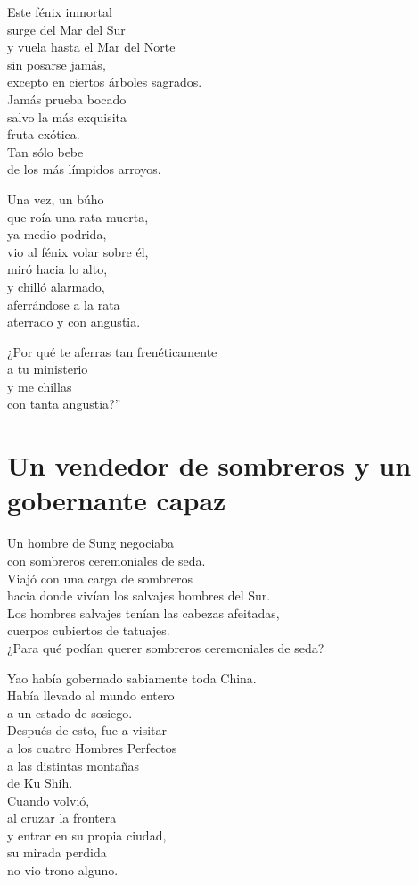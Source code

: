 \documentclass[book,b5paper,hidelinks,final]{memoir}
\begin{document}
	Este fénix inmortal\\
	surge del Mar del Sur\\
	y vuela hasta el Mar del Norte\\
	sin posarse jamás,\\
	excepto en ciertos árboles sagrados.\\
	Jamás prueba bocado\\
	salvo la más exquisita\\
	fruta exótica.\\
	Tan sólo bebe\\
	de los más límpidos arroyos.
	
	Una vez, un búho\\
	que roía una rata muerta,\\
	ya medio podrida,\\
	vio al fénix volar sobre él,\\
	miró hacia lo alto,\\
	y chilló alarmado,\\
	aferrándose a la rata\\
	aterrado y con angustia.
	
	¿Por qué te aferras tan frenéticamente\\
	a tu ministerio\\
	y me chillas\\
	con tanta angustia?''
	
	\chapter*{Un vendedor de sombreros y un gobernante capaz}
	
	Un hombre de Sung negociaba\\
	con sombreros ceremoniales de seda.\\
	Viajó con una carga de sombreros\\
	hacia donde vivían los salvajes hombres del Sur.\\
	Los hombres salvajes tenían las cabezas afeitadas,\\
	cuerpos cubiertos de tatuajes.\\
	¿Para qué podían querer sombreros ceremoniales de seda?
	
	Yao había gobernado sabiamente toda China.\\
	Había llevado al mundo entero\\
	a un estado de sosiego.\\
	Después de esto, fue a visitar\\
	a los cuatro Hombres Perfectos\\
	a las distintas montañas\\
	de Ku Shih.\\
	Cuando volvió,\\
	al cruzar la frontera\\
	y entrar en su propia ciudad,\\
	su mirada perdida\\
	no vio trono alguno.
	
\end{document}
